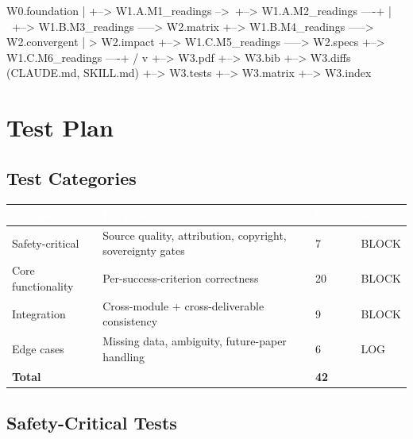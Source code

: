 \documentclass[11pt,letterpaper]{article}
\newcommand{\tableheader}[1]{\textbf{\sffamily\textcolor{white}{#1}}}
\begin{document}
\begin{asciibox}
W0.foundation
   |
   +--> W1.A.M1_readings -->\
   +--> W1.A.M2_readings ----+
   |                           \
   +--> W1.B.M3_readings -----> W2.matrix
   +--> W1.B.M4_readings -----> W2.convergent
   |                           > W2.impact
   +--> W1.C.M5_readings -----> W2.specs
   +--> W1.C.M6_readings ----+
                              /
                              v
                     +--> W3.pdf
                     +--> W3.bib
                     +--> W3.diffs (CLAUDE.md, SKILL.md)
                     +--> W3.tests
                     +--> W3.matrix
                     +--> W3.index
\end{asciibox}

\section{Test Plan}

\subsection{Test Categories}

\begin{center}
\begin{tabularx}{\textwidth}{L{4cm}XC{1.5cm}C{2cm}}
\toprule
{}
\tableheader{Category} & \tableheader{Purpose} & \tableheader{Count} & \tableheader{Action} \\
\midrule
Safety-critical & Source quality, attribution, copyright, sovereignty gates & 7 & BLOCK \\
Core functionality & Per-success-criterion correctness & 20 & BLOCK \\
Integration & Cross-module + cross-deliverable consistency & 9 & BLOCK \\
Edge cases & Missing data, ambiguity, future-paper handling & 6 & LOG \\
\midrule
\rowcolor{lightprimary}
\textbf{Total} & & \textbf{42} & \\
\bottomrule
\end{tabularx}
\end{center}

\subsection{Safety-Critical Tests}
\end{document}
